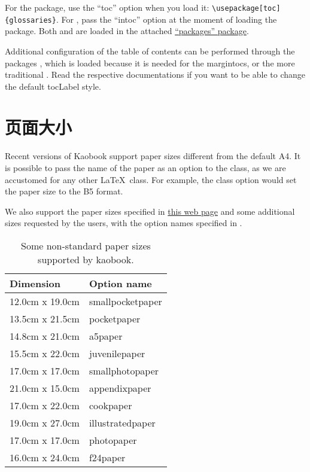 For the  package, use the \enquote{toc} option when
you load it: \lstinline|\usepackage[toc]{glossaries}|. For
, pass the \enquote{intoc} option at the moment of
loading the package. Both  and  are
loaded in the attached \href{style/packages.sty}{\enquote{packages}
package}.

Additional configuration of the table of contents can be performed
through the packages , which is loaded because it is
needed for the margintocs, or the more traditional .
Read the respective documentations if you want to be able to change the
default \acrshort{tocLabel} style.

\section{页面大小}

Recent versions of Kaobook support paper sizes different from the
default A4. It is possible to pass the name of the paper as an option
to the class, as we are accustomed for any other \LaTeX\ class. For
example, the class option  would set the paper size
to the B5 format.

We also support the paper sizes specified in
\href{https://www.bod.de/hilfe/hilfe-und-service.html?cmd=SINGLE\&entryID=2494\_GER\_WSS\&eo=2\&title=welche-buchformate-gibt-es}{this
web page} and some additional sizes requested by the users, with the
option names specified in .

\begin{table}[h!]
	\caption{Some non-standard paper sizes supported by kaobook.}
	\begin{tabular}{ll}
		\toprule
		Dimension & Option name \\
		\midrule
		12.0cm x 19.0cm & smallpocketpaper \\
		13.5cm x 21.5cm & pocketpaper \\
		14.8cm x 21.0cm & a5paper \\
		15.5cm x 22.0cm & juvenilepaper \\
		17.0cm x 17.0cm & smallphotopaper \\
		21.0cm x 15.0cm & appendixpaper \\
		17.0cm x 22.0cm & cookpaper \\
		19.0cm x 27.0cm & illustratedpaper \\
		17.0cm x 17.0cm & photopaper \\
		16.0cm x 24.0cm & f24paper \\
		\bottomrule
	\end{tabular}
\end{table}

